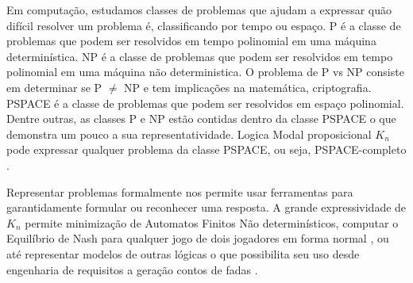 



Em computação, estudamos classes de problemas que ajudam a expressar quão difícil resolver um problema é, classificando por tempo ou espaço. P é a classe de problemas que podem ser resolvidos em tempo polinomial em uma máquina determinística. NP é a classe de problemas que podem ser resolvidos em tempo polinomial em uma máquina não deterministica. O problema de P vs NP consiste em determinar se P $\not=$ NP e tem implicações na matemática, criptografia. PSPACE é a classe de problemas que podem ser resolvidos em espaço polinomial. Dentre outras, as classes P e NP estão contidas dentro da classe PSPACE o que demonstra um pouco a sua representatividade. %
Logica Modal proposicional $K_n$ pode expressar qualquer problema da classe PSPACE, ou seja, PSPACE-completo \cite{Ladner77}.

Representar problemas formalmente nos permite usar ferramentas para garantidamente formular ou reconhecer uma resposta.
A grande expressividade de $K_n$ permite minimização de Automatos Finitos Não determinísticos\cite{nfahard}, computar o Equilíbrio de Nash para qualquer jogo de dois jogadores em forma normal \cite{nashpspace}, ou até representar modelos de outras lógicas \cite{correspkn} o que possibilita seu uso desde engenharia de requisitos \cite{reqeng} a geração contos de fadas \cite{fairytale}.

